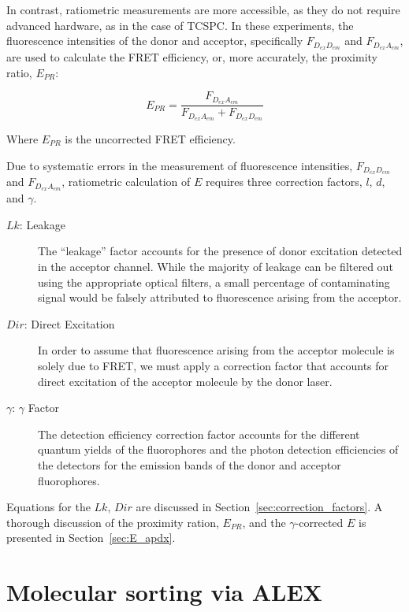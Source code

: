 In contrast, ratiometric measurements are more accessible, as they do not require advanced hardware, as in the case of \ac{TCSPC}. 
In these experiments, the fluorescence intensities of the donor and acceptor, specifically $F_{D_{ex}D_{em}}$ and $F_{D_{ex}A_{em}}$, are used to calculate the FRET efficiency, or, more accurately, the proximity ratio, $E_{PR}$:

\begin{equation}
    \label{eqn: E_ratiometric}
    E_{PR}=\frac{F_{D_{ex}A_{em}}}{F_{D_{ex}A_{em}}+F_{D_{ex}D_{em}}}
\end{equation}

\noindent
Where $E_{PR}$ is the uncorrected FRET efficiency.

Due to systematic errors in the measurement of fluorescence intensities, $F_{D_{ex}D_{em}}$ and $F_{D_{ex}A_{em}}$, ratiometric calculation of $E$ requires three correction factors, $l$, $d$, and $\gamma$.

\begin{description}
    \item[$Lk$: Leakage] The \enquote{leakage} factor accounts for the presence of donor excitation detected in the acceptor channel.
    While the majority of leakage can be filtered out using the appropriate optical filters, a small percentage of contaminating signal would be falsely attributed to fluorescence arising from the acceptor. 
    \item[$Dir$: Direct Excitation] In order to assume that fluorescence arising from the acceptor molecule is solely due to FRET, we must apply a correction factor that accounts for direct excitation of the acceptor molecule by the donor laser.
    \item[$\gamma$: $\gamma$ Factor] The detection efficiency correction factor accounts for the different quantum yields of the fluorophores and the photon detection efficiencies of the detectors for the emission bands of the donor and acceptor fluorophores.
\end{description}

Equations for the $Lk$, $Dir$ are discussed in Section~\ref{sec:correction_factors}. 
A thorough discussion of the proximity ration, $E_{PR}$, and the $\gamma$-corrected $E$ is presented in Section~\ref{sec:E_apdx}.

\newpage

\section{Molecular sorting via ALEX}
\label{sec:ALEX_intro}


